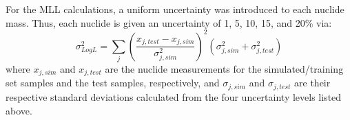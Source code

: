 For the \gls{MLL} calculations, a uniform uncertainty was introduced to each
nuclide mass.  Thus, each nuclide is given an uncertainty of 1, 5, 10, 15, and
20\% via:
\begin{equation}
  \sigma_{Log L}^2 = \sum_j \left( 
                            \frac{x_{j,test} - x_{j,sim}}{\sigma_{j,sim}^2}
                            \right)^2 
                            (\sigma_{j,sim}^2 + \sigma_{j,test}^2)
  \label{eq:mllunc}
\end{equation}
where $x_{j,sim}$ and $x_{j,test}$ are the nuclide measurements for the
simulated/training set samples and the test samples, respectively, and
$\sigma_{j,sim}$ and $\sigma_{j,test}$ are their respective standard deviations
calculated from the four uncertainty levels listed above.  
